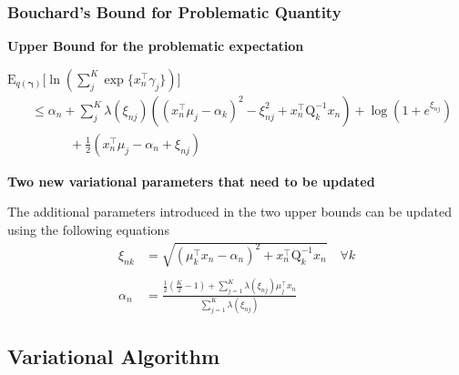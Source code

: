 \documentclass{beamer}
\newcommand{\tr}{\intercal}
\begin{document}
\begin{frame} %

\frametitle{Bouchard's Bound for Problematic Quantity}

\textbf{Upper Bound for the problematic expectation}

$\mathrm{E}_{q(\boldsymbol\gamma)} \Big[ \ln \left( \sum_{j}^K \exp \{ x_n^{\tr} \gamma_j \}\right) \Big]$
\begin{equation*}
\begin{split}
	& \leq \alpha_n + \sum_{j}^K  \lambda(\xi_{nj}) \left( (x_n^{\tr} \mu_j - \alpha_k)^2 - \xi_{nj}^2 + x_n^{\tr} \mathrm{Q}_k^{-1} x_n \right) + \log( 1 + e^{\xi_{nj}}) \\
	& \quad \quad \quad +  \frac{1}{2}\left(x_n^{\tr}\mu_j - \alpha_n + \xi_{nj}\right)
\end{split}
\end{equation*}

\textbf{Two new variational parameters that need to be updated}

The additional parameters introduced in the two upper bounds can be updated using the following equations
\begin{align*}
    \xi_{nk} & = \sqrt{\left(\mu_k^{\intercal}x_n - \alpha_n \right)^2 + x_n^{\intercal} \mathrm{Q}_k^{-1} x_n} \quad \forall k \\ \\
    \alpha_n & = \frac{\frac{1}{2}\left( \frac{K}{2} - 1\right) + \sum_{j = 1}^K \lambda \left( \xi_{nj} \right)\mu_j^{\intercal} x_n}{\sum_{j=1}^{K} \lambda \left( \xi_{nj}\right)} 
\end{align*}



\end{frame}

\subsection{Variational Algorithm}
\end{document}
